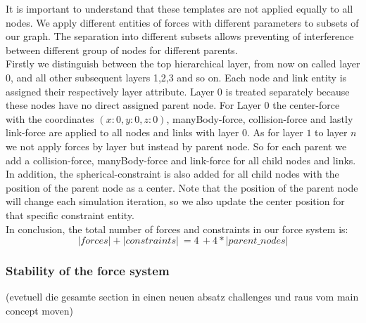 It is important to understand that these templates are not applied equally to all nodes. We apply different entities of forces with different parameters to subsets of our graph. The separation into different subsets allows preventing of interference between different group of nodes for different parents.\\ 
Firstly we distinguish between the top hierarchical layer, from now on called layer $0$, and all other subsequent layers 1,2,3 and so on. Each node and link entity is assigned their respectively layer attribute. Layer $0$ is treated separately because these nodes have no direct assigned parent node. 
For Layer $0$ the center-force with the coordinates $(x:0,y:0,z:0)$, manyBody-force, collision-force and lastly link-force are applied to all nodes and links with layer $0$. 
As for layer $1$ to layer $n$ we not apply forces by layer but instead by parent node. So for each parent we add a collision-force, manyBody-force and link-force for all child nodes and links. In addition, the spherical-constraint is also added for all child nodes with the position of the parent node as a center. Note that the position of the parent node will change each simulation iteration, so we also update the center position for that specific constraint entity.\\
In conclusion, the total number of forces and constraints in our force system is: 
\begin{equation}
    |forces| + |constraints| \: = 4 \, + 4 * |parent\_nodes|
\end{equation}

\subsubsection{Stability of the force system}
(evetuell die gesamte section in einen neuen absatz challenges und raus vom main concept moven)

